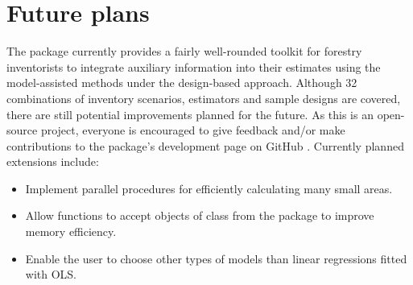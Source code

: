 \begin{figure}[h]
\centering
{}
\end{figure}



\section{Future plans}
\label{sec:future}

The  package currently provides a fairly well-rounded toolkit for forestry inventorists to integrate auxiliary information into their estimates using the model-assisted methods under the design-based approach.  Although 32 combinations of inventory scenarios, estimators and sample designs are covered, there are still potential improvements planned for the future. As this is an open-source project, everyone is encouraged to give feedback and/or make contributions to the package's development page on GitHub \citep{github_forestinventory}. Currently planned extensions include:

\begin{itemize}
\item Implement parallel procedures for efficiently calculating many small areas.
\item Allow functions to accept objects of class  from the  package \citep{dt2017} to improve memory efficiency.
\item Enable the user to choose other types of models than linear regressions fitted with OLS.
\end{itemize}

